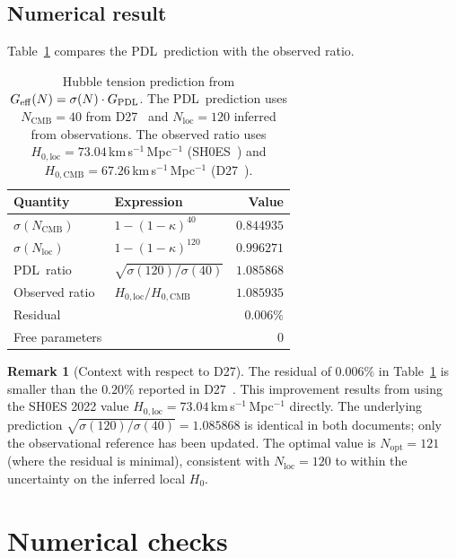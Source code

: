 \documentclass[11pt,a4paper]{article}
\theoremstyle{definition}
\newtheorem{remark}[theorem]{Remark}
\newcommand{\PDL}{\textnormal{PDL}}
\newcommand{\GPDL}{G_{\PDL}}
\newcommand{\Geff}{G_{\mathrm{eff}}}
\newcommand{\sig}{\sigma}
\newcommand{\kap}{\kappa}
\begin{document}
\subsection{Numerical result}

Table~\ref{tab:hubble} compares the \PDL\ prediction with the observed ratio.

\begin{table}[ht]
\centering
\caption{Hubble tension prediction from $\Geff(N) = \sig(N)\cdot\GPDL$. The \PDL\ prediction uses $N_{\mathrm{CMB}} = 40$ from D27~\cite{N_CMB_PDL_2026} and $N_{\mathrm{loc}} = 120$ inferred from observations. The observed ratio uses $H_{0,\mathrm{loc}} = 73.04$\,km\,s$^{-1}$\,Mpc$^{-1}$ (SH0ES~\cite{Riess2022}) and $H_{0,\mathrm{CMB}} = 67.26$\,km\,s$^{-1}$\,Mpc$^{-1}$ (D27~\cite{N_CMB_PDL_2026}).}
\label{tab:hubble}
\begin{tabular}{llr}
\toprule
Quantity & Expression & Value \\
\midrule
$\sig(N_{\mathrm{CMB}})$ & $1-(1-\kap)^{40}$ & $0.844935$ \\
$\sig(N_{\mathrm{loc}})$ & $1-(1-\kap)^{120}$ & $0.996271$ \\
\PDL\ ratio & $\sqrt{\sig(120)/\sig(40)}$ & $1.085868$ \\
Observed ratio & $H_{0,\mathrm{loc}}/H_{0,\mathrm{CMB}}$ & $1.085935$ \\
Residual & & $0.006\%$ \\
Free parameters & & $0$ \\
\bottomrule
\end{tabular}
\end{table}

\begin{remark}[Context with respect to D27]
The residual of $0.006\%$ in Table~\ref{tab:hubble} is smaller than the $0.20\%$ reported in D27~\cite{N_CMB_PDL_2026}. This improvement results from using the SH0ES 2022 value $H_{0,\mathrm{loc}} = 73.04$\,km\,s$^{-1}$\,Mpc$^{-1}$ directly. The underlying prediction $\sqrt{\sig(120)/\sig(40)} = 1.085868$ is identical in both documents; only the observational reference has been updated. The optimal value is $N_{\mathrm{opt}} = 121$ (where the residual is minimal), consistent with $N_{\mathrm{loc}} = 120$ to within the uncertainty on the inferred local $H_0$.
\end{remark}

\section{Numerical checks}
\label{sec:numerics}
\end{document}

